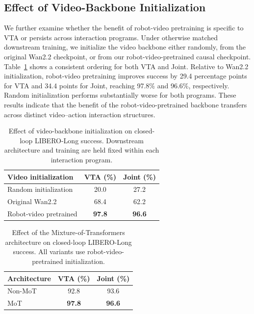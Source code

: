 \subsection{Effect of Video-Backbone Initialization}
\label{app:init-ablation}
We further examine whether the benefit of robot-video pretraining is specific to
VTA or persists across interaction programs. Under otherwise matched downstream
training, we initialize the video backbone either randomly, from the original
Wan2.2 checkpoint, or from our robot-video-pretrained causal checkpoint.
Table~\ref{tab:init-program-ablation} shows a consistent ordering for both VTA
and Joint. Relative to Wan2.2 initialization, robot-video pretraining improves
success by 29.4 percentage points for VTA and 34.4 points for Joint, reaching
97.8\% and 96.6\%, respectively. Random initialization performs substantially
worse for both programs. These results indicate that the benefit of the
robot-video-pretrained backbone transfers across distinct video--action interaction
structures.

\begin{table}[t]
    \centering
    \caption{
    Effect of video-backbone initialization on closed-loop LIBERO-Long success.
    Downstream architecture and training are held fixed within each interaction
    program.
    }
    \label{tab:init-program-ablation}
    \small
    \begin{tabular}{@{}lcc@{}}
        \toprule
        \textbf{Video initialization}
        & \textbf{VTA (\%)}
        & \textbf{Joint (\%)} \\
        \midrule
        Random initialization
        & 20.0
        & 27.2 \\
        Original Wan2.2
        & 68.4
        & 62.2 \\
        Robot-video pretrained
        & \textbf{97.8}
        & \textbf{96.6} \\
        \bottomrule
    \end{tabular}
\end{table}



\begin{table}[t]
    \centering
    \caption{
    Effect of the Mixture-of-Transformers architecture on closed-loop
    LIBERO-Long success. All variants use robot-video-pretrained
    initialization.
    }
    \label{tab:mot-ablation}
    \small
    \begin{tabular}{@{}lcc@{}}
        \toprule
        \textbf{Architecture}
        & \textbf{VTA (\%)}
        & \textbf{Joint (\%)} \\
        \midrule
        Non-MoT
        & 92.8
        & 93.6 \\
        MoT
        & \textbf{97.8}
        & \textbf{96.6} \\
        \bottomrule
    \end{tabular}
\end{table}


